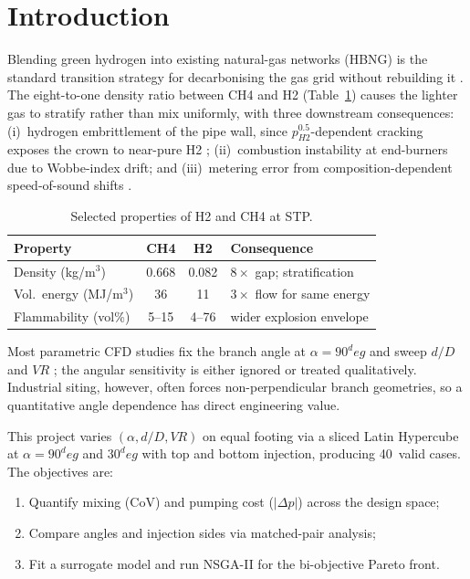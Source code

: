 \documentclass[10pt,a4paper]{article}
\def\Hi{H2}%
\def\CHi{CH4}%
\def\dD{d/D}%
\def\VR{VR}%
\def\CoV{CoV}%
\def\circ{ deg}%
\newcommand{\Hi}{\ensuremath{\mathrm{H_2}}}
\newcommand{\CHi}{\ensuremath{\mathrm{CH_4}}}
\newcommand{\dD}{\ensuremath{d/D}}
\newcommand{\VR}{\ensuremath{\mathrm{VR}}}
\newcommand{\CoV}{\ensuremath{\mathrm{CoV}}}
\begin{document}
\section{Introduction}
\label{sec:intro}

Blending green hydrogen into existing natural-gas networks (HBNG)
is the standard transition strategy for decarbonising the gas grid
without rebuilding it
\citep{su2022prediction,arya2023multi,montanes2024comprehensive}.
The eight-to-one density ratio between \CHi{} and \Hi{}
(Table~\ref{tab:properties}) causes the lighter gas to stratify
rather than mix uniformly, with three downstream consequences:
(i)~hydrogen embrittlement of the pipe wall, since
\(p_{\Hi}^{0.5}\)-dependent cracking exposes the crown to
near-pure \Hi{} \citep{topolski2022blending};
(ii)~combustion instability at end-burners due to Wobbe-index
drift; and (iii)~metering error from composition-dependent
speed-of-sound shifts \citep{su2022prediction}.

\begin{table}[H]
\centering\scriptsize
\caption{Selected properties of \Hi{} and \CHi{} at STP.}
\label{tab:properties}
\begin{tabular}{lccl}
\toprule
\textbf{Property} & \textbf{\CHi{}} & \textbf{\Hi{}} & \textbf{Consequence} \\
\midrule
Density (kg/m\(^3\))       & 0.668 & 0.082 & \(8\times\) gap; stratification \\
Vol.\ energy (MJ/m\(^3\)) & 36 & 11 & \(3\times\) flow for same energy \\
Flammability (vol\%)       & 5--15 & 4--76 & wider explosion envelope \\
\bottomrule
\end{tabular}
\end{table}

Most parametric CFD studies fix the branch angle at
\(\alpha=90^\circ\) and sweep \(\dD\) and \(\VR\)
\citep{su2022prediction,du2024numerical,montanes2024comprehensive};
the angular sensitivity is either ignored or treated qualitatively.
Industrial siting, however, often forces non-perpendicular branch
geometries, so a quantitative angle dependence has direct
engineering value.

This project varies \((\alpha,\dD,\VR)\) on equal footing via
a sliced Latin Hypercube at \(\alpha=90^\circ\) and \(30^\circ\)
with top and bottom injection, producing 40~valid cases.
The objectives are:
\begin{enumerate}
    \item Quantify mixing (\CoV) and pumping cost (\(|\Delta p|\))
    across the design space;
    \item Compare angles and injection sides via matched-pair
    analysis;
    \item Fit a surrogate model and run NSGA-II for the
    bi-objective Pareto front.
\end{enumerate}
\end{document}
